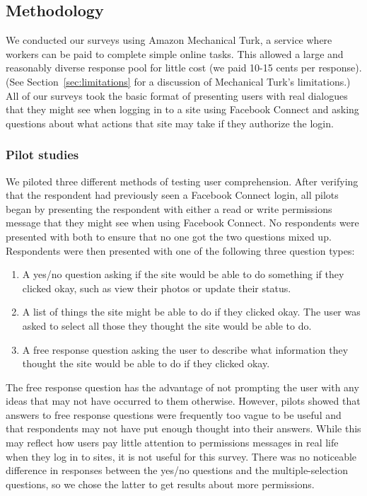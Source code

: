 \documentclass{sig-alternate}
\begin{document}
\subsection{Methodology}

We conducted our surveys using Amazon Mechanical Turk, a service where workers can be paid to complete simple online tasks. This allowed a large and reasonably diverse response pool for little cost (we paid 10-15 cents per response). (See Section~\ref{sec:limitations} for a discussion of Mechanical Turk's limitations.)
All of our surveys took the basic format of presenting users with real dialogues that they might see when logging in to a site using Facebook Connect and asking questions about what actions that site may take if they authorize the login.


\subsubsection{Pilot studies}

We piloted three different methods of testing user comprehension. After verifying that the respondent had previously seen a Facebook Connect login, all pilots began by presenting the respondent with either a read or write permissions message that they might see when using Facebook Connect. No respondents were presented with both to ensure that no one got the two questions mixed up.
Respondents were then presented with one of the following three question types:

\begin{enumerate}  
  \item A yes/no question asking if the site would be able to do something if they clicked okay, such as view their photos or update their status.
  \item A list of things the site might be able to do if they clicked okay. The user was asked to select all those they thought the site would be able to do.
  \item A free response question asking the user to describe what information they thought the site would be able to do if they clicked okay.
\end{enumerate}

The free response question has the advantage of not prompting the user with any ideas that may not have occurred to them otherwise. However, pilots showed that answers to free response questions were frequently too vague to be useful and that respondents may not have put enough thought into their answers. While this may reflect how users pay little attention to permissions messages in real life when they log in to sites, it is not useful for this survey.
There was no noticeable difference in responses between the yes/no questions and the multiple-selection questions, so we chose the latter to get results about more permissions.
\end{document}
